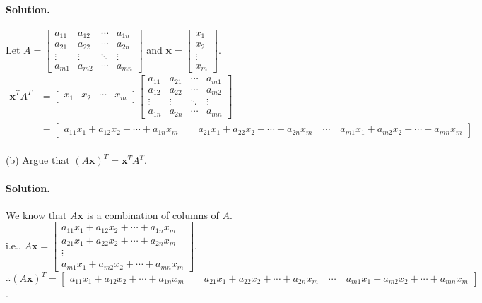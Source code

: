 \paragraph{Solution.}
Let $A = \begin{bmatrix}
    a_{11} & a_{12} & \cdots & a_{1n}\\
    a_{21} & a_{22} & \cdots & a_{2n}\\
    \vdots & \vdots & \ddots & \vdots\\
    a_{m1} & a_{m2} & \cdots & a_{mn}
\end{bmatrix}$ and $\mathbf{x} = \begin{bmatrix}
    x_1\\x_2\\\vdots\\x_m
\end{bmatrix}$.
\begin{align*}
    \mathbf{x}^TA^T &= \begin{bmatrix}
        x_1&x_2&\cdots&x_m
    \end{bmatrix}\begin{bmatrix}
        a_{11} & a_{21} & \cdots & a_{m1}\\
        a_{12} & a_{22} & \cdots & a_{m2}\\
        \vdots & \vdots & \ddots & \vdots\\
        a_{1n} & a_{2n} & \cdots & a_{mn}
    \end{bmatrix}\\
    &= \begin{bmatrix}
        a_{11}x_1 + a_{12}x_2 + \cdots + a_{1n}x_m\quad\quad
        a_{21}x_1 + a_{22}x_2 + \cdots + a_{2n}x_m\quad
        \cdots\quad
        a_{m1}x_1 + a_{m2}x_2 + \cdots + a_{mn}x_m
    \end{bmatrix}
\end{align*}\\

(b) Argue that $(A\mathbf{x})^T = \mathbf{x}^T A^T$.
\paragraph{Solution.}
We know that $A\mathbf{x}$ is a combination of columns of $A$.\\

i.e., $A\mathbf{x} = \begin{bmatrix}
    a_{11}x_1 + a_{12}x_2 + \cdots + a_{1n}x_m\\
    a_{21}x_1 + a_{22}x_2 + \cdots + a_{2n}x_m\\
    \vdots\\
    a_{m1}x_1 + a_{m2}x_2 + \cdots + a_{mn}x_m
\end{bmatrix}$.\\
$\therefore(A\mathbf{x})^T = \begin{bmatrix}
    a_{11}x_1 + a_{12}x_2 + \cdots + a_{1n}x_m\quad\quad
    a_{21}x_1 + a_{22}x_2 + \cdots + a_{2n}x_m\quad
    \cdots\quad
    a_{m1}x_1 + a_{m2}x_2 + \cdots + a_{mn}x_m
\end{bmatrix}$.\\

